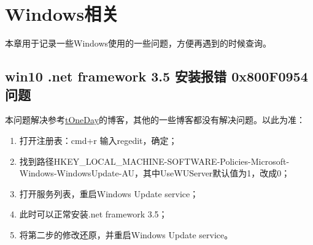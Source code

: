 \chapter{Windows相关}
本章用于记录一些Windows使用的一些问题，方便再遇到的时候查询。
\section{win10 .net framework 3.5 安装报错 0x800F0954问题}
本问题解决参考\href{https://blog.csdn.net/asd77882566/article/details/80024043}{tOneDay}的博客，其他的一些博客都没有解决问题。以此为准：
\begin{enumerate}
	\item 打开注册表：cmd+r 输入regedit，确定；
	\item 找到路径HKEY\_LOCAL\_MACHINE-SOFTWARE-Policies-Microsoft-Windows-WindowsUpdate-AU，其中UseWUServer默认值为1，改成0；
	\item 打开服务列表，重启Windows Update service；
	\item 此时可以正常安装.net framework 3.5；
	\item 将第二步的修改还原，并重启Windows Update service。
\end{enumerate}